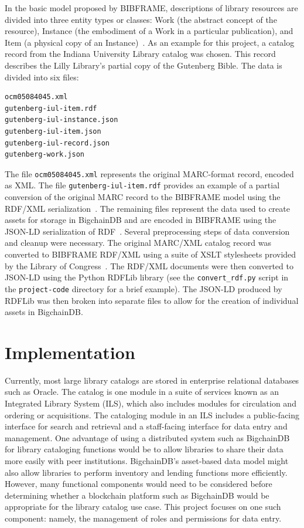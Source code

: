 In the basic model proposed by BIBFRAME, descriptions of library
resources are divided into three entity types or classes: Work (the abstract
concept of the resource), Instance (the embodiment of a Work in a particular
publication), and Item (a physical copy of an Instance)~\cite{lcbf}. As an
example for this project, a catalog record from the Indiana University
Library catalog was chosen. This record describes the Lilly Library's
partial copy of the Gutenberg Bible. The data is divided into six
files:

\begin{verbatim}
ocm05084045.xml
gutenberg-iul-item.rdf
gutenberg-iul-instance.json
gutenberg-iul-item.json
gutenberg-iul-record.json
gutenberg-work.json
\end{verbatim}

The file \verb|ocm05084045.xml| represents the original MARC-format
record, encoded as XML. The file \verb|gutenberg-iul-item.rdf| provides an
example of a partial conversion of the original MARC record to the BIBFRAME
model using the RDF/XML serialization~\cite{liam}. The remaining files
represent the data used to create assets for storage in BigchainDB and are
encoded in BIBFRAME using the JSON-LD serialization of RDF~\cite{liam}.
Several preprocessing steps of data conversion and cleanup were necessary.
The original MARC/XML catalog record was converted to BIBFRAME RDF/XML using
a suite of XSLT stylesheets provided by the Library of
Congress~\cite{lcnetdev2}. The RDF/XML documents were then converted to
JSON-LD using the Python RDFLib library (see the \verb|convert_rdf.py|
script in the \verb|project-code| directory for a brief example). The
JSON-LD produced by RDFLib was then broken into separate files to allow for
the creation of individual assets in BigchainDB.

\section{Implementation}
Currently, most large library catalogs are stored in enterprise
relational databases such as Oracle. The catalog is one module in a suite of
services known as an Integrated Library System (ILS), which also includes
modules for circulation and ordering or acquisitions. The cataloging module
in an ILS includes a public-facing interface for search and retrieval and a
staff-facing interface for data entry and management. One advantage of using
a distributed system such as BigchainDB for library cataloging functions
would be to allow libraries to share their data more easily with peer
institutions. BigchainDB's asset-based data model might also allow libraries
to perform inventory and lending functions more efficiently. However, many
functional components would need to be considered before determining whether
a blockchain platform such as BigchainDB would be appropriate for the
library catalog use case. This project focuses on one such component:
namely, the management of roles and permissions for data entry.

